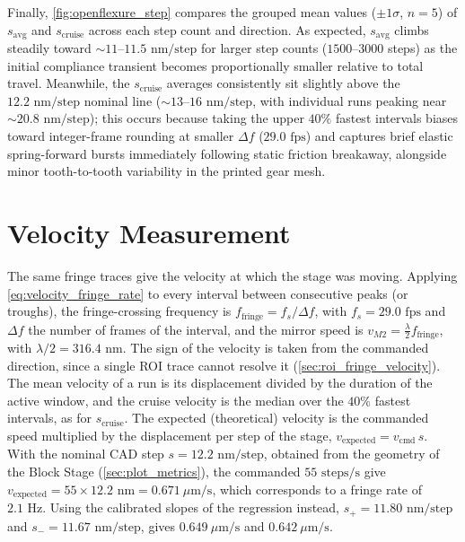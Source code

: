 Finally, \cref{fig:openflexure_step} compares the grouped mean values ($\pm 1\sigma$, $n = 5$) of $s_{\text{avg}}$ and $s_{\text{cruise}}$ across each step count and direction. As expected, $s_{\text{avg}}$ climbs steadily toward $\sim 11\text{--}11.5\text{ nm/step}$ for larger step counts ($1500\text{--}3000$ steps) as the initial compliance transient becomes proportionally smaller relative to total travel. Meanwhile, the $s_{\text{cruise}}$ averages consistently sit slightly above the $12.2\text{ nm/step}$ nominal line ($\sim 13\text{--}16\text{ nm/step}$, with individual runs peaking near $\sim 20.8\text{ nm/step}$); this occurs because taking the upper $40\%$ fastest intervals biases toward integer-frame rounding at smaller $\Delta f$ ($29.0\text{ fps}$) and captures brief elastic spring-forward bursts immediately following static friction breakaway, alongside minor tooth-to-tooth variability in the printed gear mesh.

\section{Velocity Measurement}
\label{sec:openflexure_velocity}

The same fringe traces give the velocity at which the stage was moving. Applying \cref{eq:velocity_fringe_rate} to every interval between consecutive peaks (or troughs), the fringe-crossing frequency is $f_{\text{fringe}} = f_s/\Delta f$, with $f_s = 29.0\text{ fps}$ and $\Delta f$ the number of frames of the interval, and the mirror speed is $v_{M2} = \frac{\lambda}{2}f_{\text{fringe}}$, with $\lambda/2 = 316.4\text{ nm}$. The sign of the velocity is taken from the commanded direction, since a single ROI trace cannot resolve it (\cref{sec:roi_fringe_velocity}). The mean velocity of a run is its displacement divided by the duration of the active window, and the cruise velocity is the median over the $40\%$ fastest intervals, as for $s_{\text{cruise}}$. The expected (theoretical) velocity is the commanded speed multiplied by the displacement per step of the stage, $v_{\text{expected}} = v_{\text{cmd}}\,s$. With the nominal CAD step $s = 12.2\text{ nm/step}$, obtained from the geometry of the Block Stage (\cref{sec:plot_metrics}), the commanded $55\text{ steps/s}$ give $v_{\text{expected}} = 55 \times 12.2\text{ nm} = 0.671\ \mu\text{m/s}$, which corresponds to a fringe rate of $2.1\text{ Hz}$. Using the calibrated slopes of the regression instead, $s_+ = 11.80\text{ nm/step}$ and $s_- = 11.67\text{ nm/step}$, gives $0.649\ \mu\text{m/s}$ and $0.642\ \mu\text{m/s}$.

